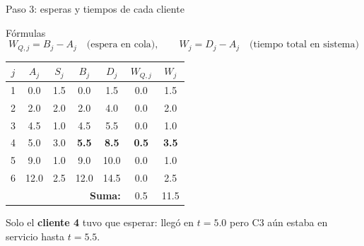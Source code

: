 \documentclass[aspectratio=1610, 9pt]{beamer}
\begin{document}
\begin{frame}{Paso 3: esperas y tiempos de cada cliente}

\begin{block}{F\'{o}rmulas}
\[
W_{Q,j} = B_j - A_j \quad \text{(espera en cola)}, \qquad
W_j = D_j - A_j \quad \text{(tiempo total en sistema)}
\]
\end{block}

\vspace{0.1cm}
\begin{center}
\small
\begin{tabular}{c c c c c c c}
\toprule
$j$ & $A_j$ & $S_j$ & $B_j$ & $D_j$ & $W_{Q,j}$ & $W_j$ \\
\midrule
1 & 0.0 & 1.5 & 0.0 & 1.5 & \cellcolor{idle}0.0 & 1.5 \\
2 & 2.0 & 2.0 & 2.0 & 4.0 & \cellcolor{idle}0.0 & 2.0 \\
3 & 4.5 & 1.0 & 4.5 & 5.5 & \cellcolor{idle}0.0 & 1.0 \\
4 & 5.0 & 3.0 & \textbf{5.5} & \textbf{8.5} & \cellcolor{rojo!20}\textbf{0.5} & \textbf{3.5} \\
5 & 9.0 & 1.0 & 9.0 & 10.0 & \cellcolor{idle}0.0 & 1.0 \\
6 & 12.0 & 2.5 & 12.0 & 14.5 & \cellcolor{idle}0.0 & 2.5 \\
\midrule
\multicolumn{5}{r}{\textbf{Suma:}} & 0.5 & 11.5 \\
\bottomrule
\end{tabular}
\end{center}

\vspace{0.2cm}
Solo el \textbf{cliente 4} tuvo que esperar: lleg\'{o} en $t=5.0$ pero C3 a\'{u}n estaba en servicio hasta $t=5.5$.
\end{frame}
\end{document}
